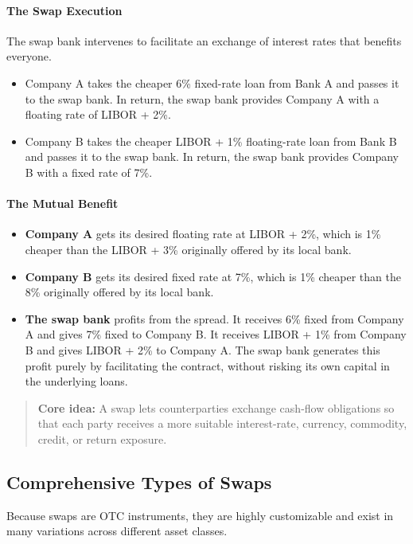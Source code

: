 \documentclass[12pt,openany]{book}
\begin{document}
\paragraph{The Swap Execution}
The swap bank intervenes to facilitate an exchange of interest rates that benefits everyone.

\begin{itemize}[leftmargin=*]
    \item Company A takes the cheaper 6\% fixed-rate loan from Bank A and passes it to the swap bank. In return, the swap bank provides Company A with a floating rate of LIBOR + 2\%.
    \item Company B takes the cheaper LIBOR + 1\% floating-rate loan from Bank B and passes it to the swap bank. In return, the swap bank provides Company B with a fixed rate of 7\%.
\end{itemize}

\paragraph{The Mutual Benefit}

\begin{itemize}[leftmargin=*]
    \item \textbf{Company A} gets its desired floating rate at LIBOR + 2\%, which is 1\% cheaper than the LIBOR + 3\% originally offered by its local bank.
    \item \textbf{Company B} gets its desired fixed rate at 7\%, which is 1\% cheaper than the 8\% originally offered by its local bank.
    \item \textbf{The swap bank} profits from the spread. It receives 6\% fixed from Company A and gives 7\% fixed to Company B. It receives LIBOR + 1\% from Company B and gives LIBOR + 2\% to Company A. The swap bank generates this profit purely by facilitating the contract, without risking its own capital in the underlying loans.
\end{itemize}

\begin{quote}
\textbf{Core idea:} A swap lets counterparties exchange cash-flow obligations so that each party receives a more suitable interest-rate, currency, commodity, credit, or return exposure.
\end{quote}

\subsection{Comprehensive Types of Swaps}
Because swaps are OTC instruments, they are highly customizable and exist in many variations across different asset classes.
\end{document}
